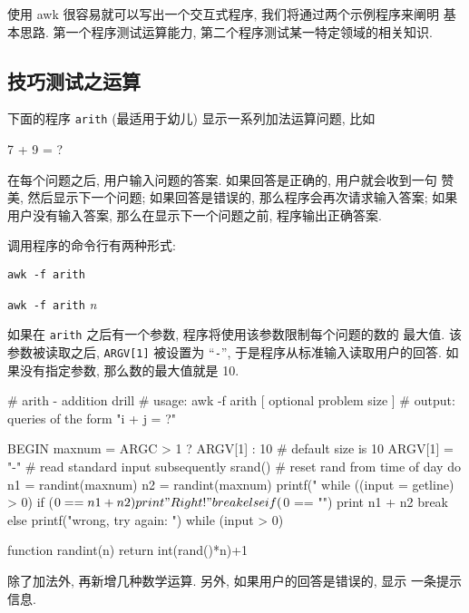 {使用 awk 很容易就可以写出一个交互式程序, 我们将通过两个示例程序来阐明
基本思路. 第一个程序测试运算能力, 第二个程序测试某一特定领域的相关知识.

\subsection{技巧测试之运算}
\label{subsec:skills_testing_arithmetic}

下面的程序 \texttt{arith} (最适用于幼儿) 显示一系列加法运算问题, 比如 
\begin{file}
    7 + 9 = ?
\end{file}
在每个问题之后, 用户输入问题的答案. 如果回答是正确的, 用户就会收到一句
赞美, 然后显示下一个问题; 如果回答是错误的, 那么程序会再次请求输入答案;
如果用户没有输入答案, 那么在显示下一个问题之前, 程序输出正确答案.

调用程序的命令行有两种形式:
\begin{pattern}
    \indent\indent\texttt{awk -f arith} \par 
    \indent\indent\texttt{awk -f arith} \textit{n}
\end{pattern}
如果在 \texttt{arith} 之后有一个参数, 程序将使用该参数限制每个问题的数的
最大值. 该参数被读取之后, \texttt{ARGV[1]} 被设置为 ``\texttt{-}'',
于是程序从标准输入读取用户的回答. 如果没有指定参数, 那么数的最大值就是
10.
\begin{awkcode}
    # arith - addition drill
    #   usage:  awk -f arith [ optional problem size ]
    #   output: queries of the form "i + j = ?"

    BEGIN {
        maxnum = ARGC > 1 ? ARGV[1] : 10   # default size is 10
        ARGV[1] = "-"  # read standard input subsequently
        srand()        # reset rand from time of day
        do {
            n1 = randint(maxnum)
            n2 = randint(maxnum)
            printf("%
            while ((input = getline) > 0)
                if ($0 == n1 + n2) {
                    print "Right!"
                    break
                } else if ($0 == "") {
                    print n1 + n2
                    break
                } else
                    printf("wrong, try again: ")
        } while (input > 0)
    }

    function randint(n) { return int(rand()*n)+1 }
\end{awkcode}

\begin{exercise}
    除了加法外, 再新增几种数学运算. 另外, 如果用户的回答是错误的, 显示 
    一条提示信息.
\end{exercise}

}
